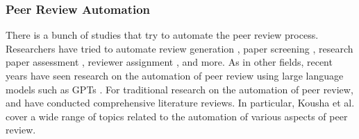 

\subsubsection{Peer Review Automation}

There is a bunch of studies that try to automate the peer review process. Researchers have tried to automate review generation \cite{yuan2022can,yuan2022kid,wang2020reviewrobot}, paper screening \cite{schulz2022future}, research paper assessment \cite{kousha2022artificial}, reviewer assignment \cite{zhao2022reviewer}, and more. As in other fields, recent years have seen research on the automation of peer review using large language models such as GPTs \cite{wexin2023can,liu2023reviewergpt,robertson2023gpt4,hosseini2023fighting}. For traditional research on the automation of peer review, \cite{kousha2022artificial} and \cite{lin2021automated1} have conducted comprehensive literature reviews. In particular, Kousha et al. cover a wide range of topics related to the automation of various aspects of peer review.

